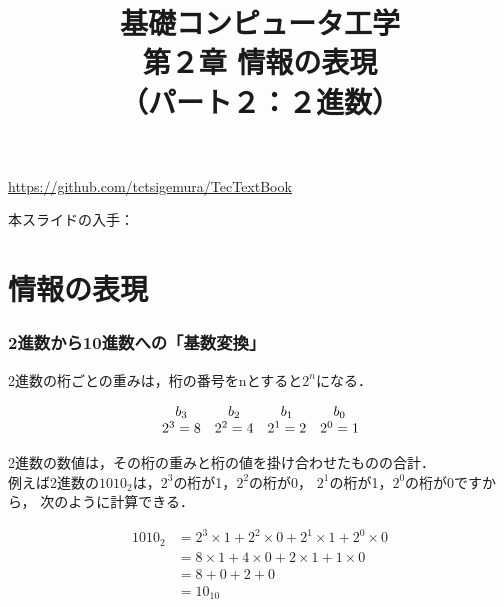 \documentclass[handout]{beamer}        %
\begin{document}
\title{基礎コンピュータ工学\\第２章 情報の表現\\
       （パート２：２進数）}
\date{}

\begin{frame}
  \titlepage
  \centerline{\url{https://github.com/tctsigemura/TecTextBook}}
  \vfill
  \centerline{本スライドの入手：
    }
\end{frame}


\section{情報の表現}
\begin{frame}
  \frametitle{2進数から10進数への「基数変換」}
  2進数の桁ごとの重みは，桁の番号をnとすると$2^n$になる．

\[
\begin{array}{c c c c c }
b_3     & b_2     & b_1     & b_0     \\
2^3 = 8 & 2^2 = 4 & 2^1 = 2 & 2^0 = 1 \\
\end{array}
\]

2進数の数値は，その桁の重みと桁の値を掛け合わせたものの合計．\\
例えば2進数の$1010_2$は，$2^3$の桁が1，$2^2$の桁が0，
$2^1$の桁が1，$2^0$の桁が0ですから，
次のように計算できる．

\begin{align*}
1010_2 &= 2^3 \times 1 + 2^2 \times 0 + 2^1 \times 1 + 2^0 \times 0 \\
       &= 8 \times 1 + 4 \times 0 + 2 \times 1 + 1 \times 0 \\
       &= 8 + 0 + 2 + 0 \\
       &= 10_{10}
\end{align*}
\end{frame}
\end{document}
